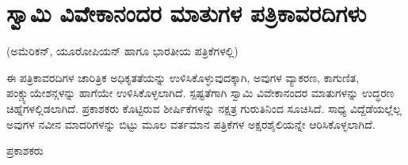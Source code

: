 
\chapter*{ಸ್ವಾಮಿ ವಿವೇಕಾನಂದರ ಮಾತುಗಳ ಪತ್ರಿಕಾವರದಿಗಳು}

\begin{center}
(ಅಮೆರಿಕನ್, ಯೂರೋಪಿಯನ್ ಹಾಗೂ ಭಾರತೀಯ ಪತ್ರಿಕೆಗಳಲ್ಲಿ)
\end{center}

ಈ ಪತ್ರಿಕಾವರದಿಗಳ ಚಾರಿತ್ರಿಕ ಅಧಿಕೃತತೆಯನ್ನು ಉಳಿಸಿಕೊಳ್ಳುವುದಕ್ಕಾಗಿ, ಅವುಗಳ ವ್ಯಾಕರಣ, ಕಾಗುಣಿತ, ಪಂಕ್ಚ್ಯುಯೇಶನ್ಗಳನ್ನು ಹಾಗೆಯೇ ಉಳಿಸಿಕೊಳ್ಳಲಾಗಿದೆ. ಸ್ಪಷ್ಟತೆಗಾಗಿ ಸ್ವಾಮಿ ವಿವೇಕಾನಂದರ ಮಾತುಗಳನ್ನು ಉದ್ಧರಣ ಚಿಹ್ನೆಗಳಲ್ಲಿಡಲಾಗಿದೆ. ಪ್ರಕಾಶಕರು ಕೊಟ್ಟಿರುವ ಶೀರ್ಷಿಕೆಗಳನ್ನು ನಕ್ಷತ್ರ ಗುರುತಿನಿಂದ ಸೂಚಿಸಿದೆ. ಸಾಧ್ಯ ವಿದ್ದೆಡೆಯಲ್ಲೆಲ್ಲ ಅವುಗಳ ನವೀನ ಮಾದರಿಗಳನ್ನು ಬಿಟ್ಟು ಮೂಲ ವರ್ತಮಾನ ಪತ್ರಿಕೆಗಳ ಅಕ್ಷರಶೈಲಿಯನ್ನೇ ಆರಿಸಿಕೊಳ್ಳಲಾಗಿದೆ.

\begin{flushright}
ಪ್ರಕಾಶಕರು
\end{flushright}

